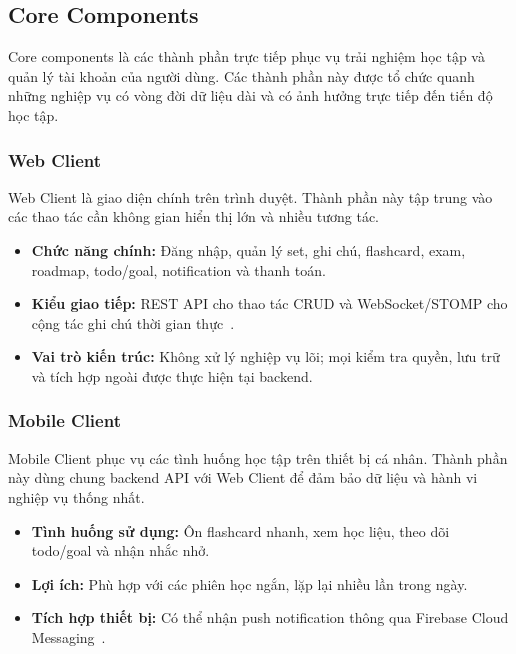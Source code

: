 \subsection{Core Components}
\label{subsec:core-components}

Core components là các thành phần trực tiếp phục vụ trải nghiệm học tập và quản lý tài khoản của người dùng. Các thành phần này được tổ chức quanh những nghiệp vụ có vòng đời dữ liệu dài và có ảnh hưởng trực tiếp đến tiến độ học tập.

\subsubsection{Web Client}
\label{subsubsec:web-client}

Web Client là giao diện chính trên trình duyệt. Thành phần này tập trung vào các thao tác cần không gian hiển thị lớn và nhiều tương tác.

\begin{itemize}
    \item \textbf{Chức năng chính:} Đăng nhập, quản lý set, ghi chú, flashcard, exam, roadmap, todo/goal, notification và thanh toán.
    \item \textbf{Kiểu giao tiếp:} REST API cho thao tác CRUD và WebSocket/STOMP cho cộng tác ghi chú thời gian thực~\cite{springwebsocketstomp}.
    \item \textbf{Vai trò kiến trúc:} Không xử lý nghiệp vụ lõi; mọi kiểm tra quyền, lưu trữ và tích hợp ngoài được thực hiện tại backend.
\end{itemize}

\subsubsection{Mobile Client}
\label{subsubsec:mobile-client}

Mobile Client phục vụ các tình huống học tập trên thiết bị cá nhân. Thành phần này dùng chung backend API với Web Client để đảm bảo dữ liệu và hành vi nghiệp vụ thống nhất.

\begin{itemize}
    \item \textbf{Tình huống sử dụng:} Ôn flashcard nhanh, xem học liệu, theo dõi todo/goal và nhận nhắc nhở.
    \item \textbf{Lợi ích:} Phù hợp với các phiên học ngắn, lặp lại nhiều lần trong ngày.
    \item \textbf{Tích hợp thiết bị:} Có thể nhận push notification thông qua Firebase Cloud Messaging~\cite{firebasefcm}.
\end{itemize}


